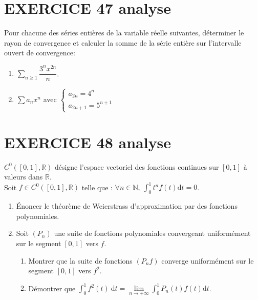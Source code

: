\documentclass[10pt,oneside]{article}
\begin{document}
\begin{flushleft}
\begin{enumerate}
\end{enumerate}



\section*{EXERCICE 47 \:analyse }

Pour chacune des séries entières de la variable réelle suivantes, déterminer le rayon de convergence et calculer la somme de la série entière sur l'intervalle ouvert de convergence:\\
\begin{enumerate}
\item
$\displaystyle\sum_{n\geqslant 1}^{} \dfrac{3^nx^{2n}}{n}$.\:\:\:\:
\item
$\displaystyle\sum a_nx^n$ avec $\left\lbrace \begin{array}{l}
a_{2n}=4^n\\
a_{2n+1}=5^{n+1}
\end{array}\right. $\:\:\:\:

\end{enumerate}
\section*{EXERCICE 48 \:analyse }


$C^{0}\left( \left[ 0,1\right] ,\mathbb{R}\right) $ désigne l'espace vectoriel des fonctions continues sur  $
\left[ 0,1\right] $ à valeurs dans $\mathbb{R}$.\\

Soit $f\in C^{0}\left( \left[ 0,1\right] ,\mathbb{R}\right) $ telle que :  
$ \forall n\in \mathbb{N},\:
\displaystyle\int_{0}^{1}t^{n}f\left( t\right) \mathrm{d}t=0$.


\begin{enumerate}
\item \'Enoncer le th\'{e}or\`{e}me de Weierstrass d'approximation par des
fonctions polynomiales.
\item

Soit $\left( P_{n}\right) $ une suite de fonctions polynomiales
convergeant uniform\'{e}ment sur le segment $\left[ 0,1\right]$ vers $f$.
\begin{enumerate}
\item
 Montrer que la suite de fonctions $\left( P_{n}f\right) $
converge uniform\'{e}ment sur le segment $\left[ 0,1\right] $ vers $f^2$.

\item D\'{e}montrer que $\displaystyle\int_{0}^{1} f^2(t)
 \ \mathrm{d}t=\underset{n\rightarrow +\infty }{\lim }
\displaystyle\int_{0}^{1}P_{n}(t)f(t)\mathrm{d}t $.


\end{enumerate}
\end{enumerate}
\end{flushleft}
\end{document}
